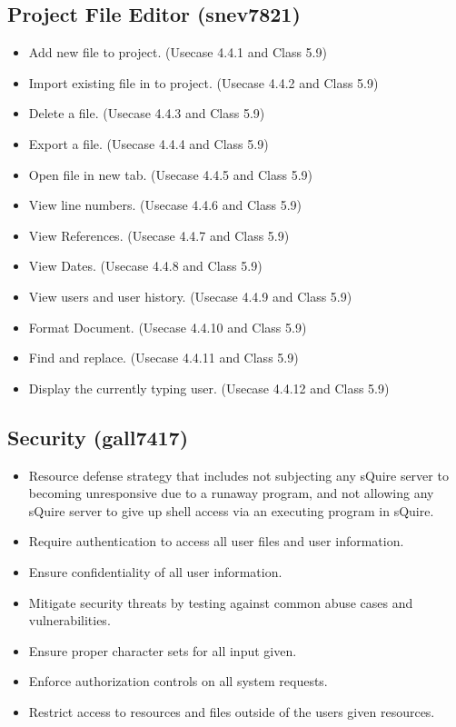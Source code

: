\documentclass[11pt]{report}
\begin{document}
   \subsection{Project File Editor (snev7821)}
        \begin{itemize}
            \item Add new file to project. (Usecase 4.4.1 and Class 5.9)
            \item Import existing file in to project. (Usecase 4.4.2 and Class 5.9)
            \item Delete a file. (Usecase 4.4.3 and Class 5.9)
            \item Export a file. (Usecase 4.4.4 and Class 5.9)
            \item Open file in new tab. (Usecase 4.4.5 and Class 5.9)
            \item View line numbers. (Usecase 4.4.6 and Class 5.9)
            \item View References. (Usecase 4.4.7 and Class 5.9)
            \item View Dates. (Usecase 4.4.8 and Class 5.9)
            \item View users and user history. (Usecase 4.4.9 and Class 5.9)
            \item Format Document. (Usecase 4.4.10 and Class 5.9)
            \item Find and replace. (Usecase 4.4.11 and Class 5.9)
            \item Display the currently typing user. (Usecase 4.4.12 and Class 5.9)
        \end{itemize}
    \subsection{Security (gall7417)}
        \begin{itemize}
            \item Resource defense strategy that includes not subjecting any sQuire server to becoming unresponsive due to a runaway program, and not allowing any sQuire server to give up shell access via an executing program in sQuire.
            \item Require authentication to access all user files and user information.
            \item Ensure confidentiality of all user information.
            \item Mitigate security threats by testing against common abuse cases and vulnerabilities.
            \item Ensure proper character sets for all input given.
            \item Enforce authorization controls on all system requests.
            \item Restrict access to resources and files outside of the users given resources.
        \end{itemize}
\end{document}
